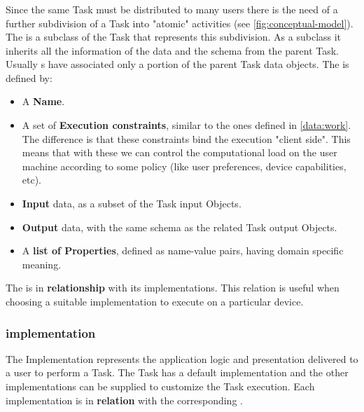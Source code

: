 \subsubsection{\utask{}}
Since the same Task must be distributed to many users there is the need of a
further subdivision of a Task into "atomic" activities (see
\autoref{fig:conceptual-model}).
The \utask{} is a subclass of the Task that represents this subdivision. As
a subclass it inherits all the information of the data and the schema from the
parent Task. Usually \utask{}s have associated only a portion of the parent
Task data objects. The \utask{} is defined by:
\begin{itemize}
    \item A \textbf{Name}.
    
    \item A set of \textbf{Execution constraints}, similar to the ones defined
    in \ref{data:work}. The difference is that these constraints bind the
    execution "client side". This means that with these we can control the
    computational load on the user machine according to some policy (like
    user preferences, device capabilities, etc).
    
    \item \textbf{Input} data, as a subset of the Task input Objects.
    \item \textbf{Output} data, with the same schema as the related Task output
    Objects.
    
    \item A \textbf{list of Properties}, defined as name-value pairs, having
    domain specific meaning.
\end{itemize}

The \utask{} is in \textbf{relationship} with its \utask{} implementations. This
relation is useful when choosing a suitable implementation to execute on a
particular device.



\subsubsection{\utask{} implementation}
The \utask{} Implementation represents the application logic and presentation
delivered to a user to perform a Task. The Task has a default implementation
and the other implementations can be supplied to customize the Task execution.
Each \utask{} implementation is in \textbf{relation} with the corresponding
\utask{}.




